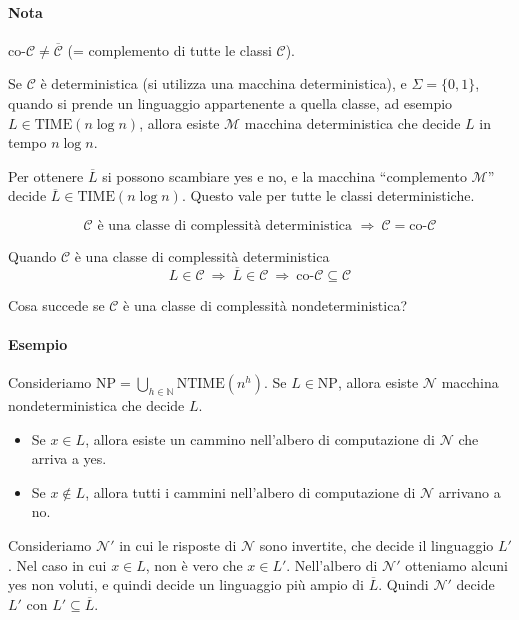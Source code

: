 \paragraph{Nota} $\text{co-}\mathcal{C} \neq \overline{\mathcal{C}}$ (= complemento di tutte le classi $\mathcal{C}$). \medskip

Se $\mathcal{C}$ è deterministica (si utilizza una macchina deterministica), e $\Sigma=\{0,1\}$, quando si prende un linguaggio appartenente a quella classe, ad esempio $L\in\text{TIME}(n\log n)$, allora esiste $\mathcal{M}$ macchina deterministica che decide $L$ in tempo $n\log n$.

Per ottenere $\overline{L}$ si possono scambiare yes e no, e la macchina ``complemento $\mathcal{M}$'' decide $\overline{L}\in\text{TIME}(n\log n)$. Questo vale per tutte le classi deterministiche.
\begin{property}
    $$
    \mathcal{C} \text{ è una classe di complessità deterministica }
    \Rightarrow
    ~\mathcal{C} = \text{co-}\mathcal{C}
    $$
\end{property}
\begin{property}
    Quando $\mathcal{C}$ è una classe di complessità deterministica
    $$
        L\in\mathcal{C} 
        ~\Rightarrow~
        \overline{L}\in\mathcal{C}
        ~\Rightarrow~
        \text{co-}\mathcal{C}\subseteq\mathcal{C}
    $$
\end{property}
Cosa succede se $\mathcal{C}$ è una classe di complessità nondeterministica?
\paragraph{Esempio} Consideriamo $\text{NP}=\bigcup_{h\in\mathbb{N}}\text{NTIME}(n^h)$. Se $L\in\text{NP}$, allora esiste $\mathcal{N}$ macchina nondeterministica che decide $L$.
\begin{itemize}
    \item Se $x\in L$, allora esiste un cammino nell'albero di computazione di $\mathcal{N}$ che arriva a yes.
    \item Se $x\notin L$, allora tutti i cammini nell'albero di computazione di $\mathcal{N}$ arrivano a no.
\end{itemize}
Consideriamo $\mathcal{N}'$ in cui le risposte di $\mathcal{N}$ sono invertite, che decide il linguaggio $L'$. Nel caso in cui $x\in L$, non è vero che $x\in L'$. Nell'albero di $\mathcal{N}'$ otteniamo alcuni yes non voluti, e quindi decide un linguaggio più ampio di $\overline{L}$. Quindi $\mathcal{N}'$ decide $L'$ con $L'\subseteq\overline{L}$.


